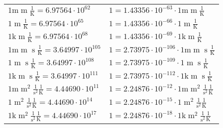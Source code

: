\begin{center}
\begin{longtable}{l l}
{\color{gray}$1 \bm{\mathrm{ m}}{\operatorname{m}}{}{}\frac1{\operatorname{K}} = 6.97564\cdot10^{62} $}   & {\color{gray}$ 1 = 1.43356\cdot10^{-63} \cdot 1 \bm{\mathrm{ m}}{\operatorname{m}}{}{}\frac1{\operatorname{K}}$}  \\
{\color{black}$1 \bm{\mathrm{ }}{\operatorname{m}}{}{}\frac1{\operatorname{K}} = 6.97564\cdot10^{65} $}   & {\color{black}$ 1 = 1.43356\cdot10^{-66} \cdot 1 \bm{\mathrm{ }}{\operatorname{m}}{}{}\frac1{\operatorname{K}}$}  \\
{\color{gray}$1 \bm{\mathrm{ k}}{\operatorname{m}}{}{}\frac1{\operatorname{K}} = 6.97564\cdot10^{68} $}   & {\color{gray}$ 1 = 1.43356\cdot10^{-69} \cdot 1 \bm{\mathrm{ k}}{\operatorname{m}}{}{}\frac1{\operatorname{K}}$}  \\
{\color{gray}$1 \bm{\mathrm{ m}}{\operatorname{m}}{\operatorname{s}}{}\frac1{\operatorname{K}} = 3.64997\cdot10^{105} $}   & {\color{gray}$ 1 = 2.73975\cdot10^{-106} \cdot 1 \bm{\mathrm{ m}}{\operatorname{m}}{\operatorname{s}}{}\frac1{\operatorname{K}}$}  \\
{\color{black}$1 \bm{\mathrm{ }}{\operatorname{m}}{\operatorname{s}}{}\frac1{\operatorname{K}} = 3.64997\cdot10^{108} $}   & {\color{black}$ 1 = 2.73975\cdot10^{-109} \cdot 1 \bm{\mathrm{ }}{\operatorname{m}}{\operatorname{s}}{}\frac1{\operatorname{K}}$}  \\
{\color{gray}$1 \bm{\mathrm{ k}}{\operatorname{m}}{\operatorname{s}}{}\frac1{\operatorname{K}} = 3.64997\cdot10^{111} $}   & {\color{gray}$ 1 = 2.73975\cdot10^{-112} \cdot 1 \bm{\mathrm{ k}}{\operatorname{m}}{\operatorname{s}}{}\frac1{\operatorname{K}}$}  \\
{\color{gray}$1 \bm{\mathrm{ m}}{\operatorname{m}^2}\frac1{\operatorname{s}^2}{}\frac1{\operatorname{K}} = 4.44690\cdot10^{11} $}   & {\color{gray}$ 1 = 2.24876\cdot10^{-12} \cdot 1 \bm{\mathrm{ m}}{\operatorname{m}^2}\frac1{\operatorname{s}^2}{}\frac1{\operatorname{K}}$}  \\
{\color{black}$1 \bm{\mathrm{ }}{\operatorname{m}^2}\frac1{\operatorname{s}^2}{}\frac1{\operatorname{K}} = 4.44690\cdot10^{14} $}   & {\color{black}$ 1 = 2.24876\cdot10^{-15} \cdot 1 \bm{\mathrm{ }}{\operatorname{m}^2}\frac1{\operatorname{s}^2}{}\frac1{\operatorname{K}}$}  \\
{\color{gray}$1 \bm{\mathrm{ k}}{\operatorname{m}^2}\frac1{\operatorname{s}^2}{}\frac1{\operatorname{K}} = 4.44690\cdot10^{17} $}   & {\color{gray}$ 1 = 2.24876\cdot10^{-18} \cdot 1 \bm{\mathrm{ k}}{\operatorname{m}^2}\frac1{\operatorname{s}^2}{}\frac1{\operatorname{K}}$}  \\

\end{longtable}
\end{center}
